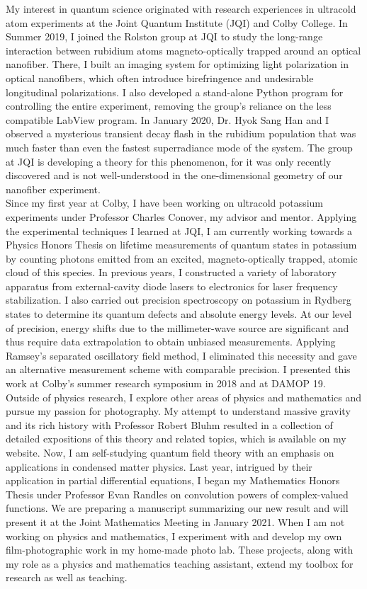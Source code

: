 \documentclass[12pt]{article}
\begin{document}
My interest in quantum science originated with research experiences in ultracold atom experiments at the Joint Quantum Institute (JQI) and Colby College. In Summer 2019, I joined the Rolston group at JQI to study the long-range interaction between rubidium atoms magneto-optically trapped around an optical nanofiber. There, I built an imaging system for optimizing light polarization in optical nanofibers, which often introduce birefringence and undesirable longitudinal polarizations. I also developed a stand-alone Python program for controlling the entire experiment, removing the group's reliance on the less compatible LabView program. In January 2020, Dr. Hyok Sang Han and I observed a mysterious transient decay flash in the rubidium population that was much faster than even the fastest superradiance mode of the system.  The group at JQI is developing a theory for this phenomenon, for it was only recently discovered and is not well-understood in the one-dimensional geometry of our nanofiber experiment.   \\ 

Since my first year at Colby, I have been working on ultracold potassium experiments under Professor Charles Conover, my advisor and mentor. Applying the experimental techniques I learned at JQI, I am currently working towards a Physics Honors Thesis on lifetime measurements of quantum states in potassium by counting photons emitted from an excited, magneto-optically trapped, atomic cloud of this species. In previous years, I constructed a variety of laboratory apparatus from external-cavity diode lasers to electronics for laser frequency stabilization. I also carried out precision spectroscopy on potassium in Rydberg states to determine its quantum defects and absolute energy levels. At our level of precision, energy shifts due to the millimeter-wave source are significant and thus require data extrapolation to obtain unbiased measurements. Applying Ramsey's separated oscillatory field method, I eliminated this necessity and gave an alternative measurement scheme with comparable precision. I presented this work at Colby's summer research symposium in 2018 and at DAMOP 19.  \\

Outside of physics research, I explore other areas of physics and mathematics and pursue my passion for photography. My attempt to understand massive gravity and its rich history with Professor Robert Bluhm resulted in a collection of detailed expositions of this theory and related topics, which is available on my website. Now, I am self-studying quantum field theory with an emphasis on applications in condensed matter physics. Last year, intrigued by their application in partial differential equations, I began my Mathematics Honors Thesis under Professor Evan Randles on convolution powers of complex-valued functions. We are preparing a manuscript summarizing our new result and will present it at the Joint Mathematics Meeting in January 2021. When I am not working on physics and mathematics, I experiment with and develop my own film-photographic work in my home-made photo lab. These projects, along with my role as a physics and mathematics teaching assistant, extend my toolbox for research as well as teaching.  \\ 
\end{document}
